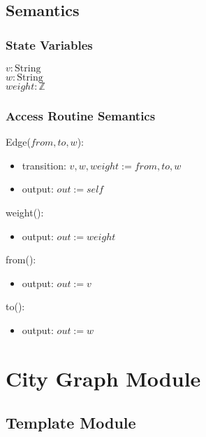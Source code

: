 \documentclass[12pt]{article}
\begin{document}
\subsection* {Semantics}

\subsubsection* {State Variables}

$\mathit{v}: \text{String}$\\
$\mathit{w}: \text{String}$\\
$\mathit{weight}: \mathbb{Z}$\\

\subsubsection* {Access Routine Semantics}

Edge($from, to, w$):
\begin{itemize}
\item transition: $v, w, weight := from, to, w$ 

\item output: $\mathit{out} := \mathit{self}$
\end{itemize}


\noindent weight():
\begin{itemize}
\item output: $\mathit{out} := weight$
\end{itemize}

\noindent from():
\begin{itemize}
\item output: $\mathit{out} := v$
\end{itemize}

\noindent to():
\begin{itemize}
\item output: $\mathit{out} := w$
\end{itemize}




\newpage

\section* {City Graph Module}

\subsection* {Template Module}
\end{document}
